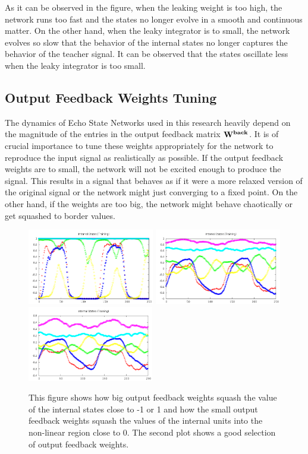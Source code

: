 \documentclass[letterpaper,9pt]{article}
\begin{document}
As it can be observed in the figure, when the leaking weight is too high, the network runs too fast and the states no longer evolve in a smooth and continuous matter. On the other hand, when the leaky integrator is to small, the network evolves so slow that the behavior of the internal states no longer captures the behavior of the teacher signal. It can be observed that the states oscillate less when the leaky integrator is too small. 

\subsection{Output Feedback Weights Tuning}

The dynamics of Echo State Networks used in this research heavily depend on the magnitude of the entries in the output feedback matrix ${\bf W^{back}}$. It is of crucial importance to tune these weights appropriately for the network to reproduce the input signal as realistically as possible. If the output feedback weights are to small, the network will not be excited enough to produce the signal. This results in a signal that behaves as if it were a more relaxed version of the original signal or the network might just converging to a fixed point. On the other hand, if the weights are too big, the network might behave chaotically or get squashed to border values.

\begin{figure}[h!]
  \centering
  \includegraphics[height=125px]{Extra/ofbw_big.png}
  \includegraphics[height=125px]{Extra/ofbw_ok.png}
  \includegraphics[height=125px]{Extra/ofbw_small.png}
    \caption[Output Feedback Weights Comparison]{This figure shows how big output feedback weights squash the value of the internal states close to -1 or 1 and how the small output feedback weights squash the values of the internal units into the non-linear region close to 0. The second plot shows a good selection of output feedback weights.}
\end{figure}
\end{document}
